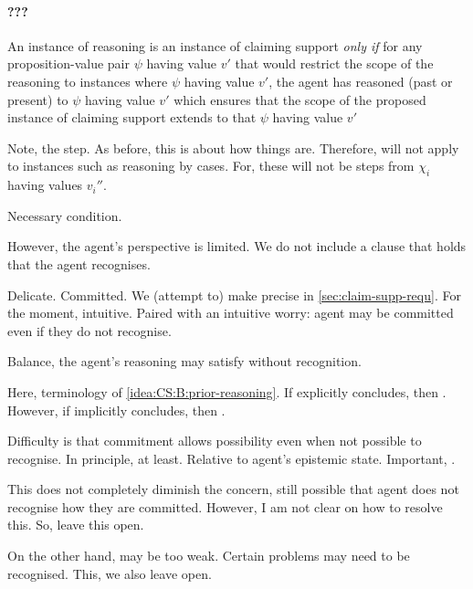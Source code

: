 \hozlinedash


\paragraph{???}

\begin{note}
  \color{red}
  An instance of reasoning is an instance of claiming support \emph{only if} for any proposition-value pair \(\psi\) having value \(v'\) that would restrict the scope of the reasoning to instances where \(\psi\) having value \(v'\), the agent has reasoned (past or present) to \(\psi\) having value \(v'\) which ensures that the scope of the proposed instance of claiming support extends to \ep{} that \(\psi\) having value \(v'\)
\end{note}

\begin{note}
  \color{red}
  Note, the step.
  As before, this is about how things are.
  Therefore, will not apply to instances such as reasoning by cases.
  For, these will not be steps from \(\chi_{i}\) having values \(v_{i}''\).

  Necessary condition.
\end{note}

\begin{note}
  However, the agent's perspective is limited.
  We do not include a clause that holds that the agent recognises.

  Delicate.
  Committed.
  We (attempt to) make precise in \autoref{sec:claim-supp-requ}.
  For the moment, intuitive.
  Paired with an intuitive worry: agent may be committed even if they do not recognise.

  Balance, the agent's reasoning may satisfy without recognition.

  Here,  terminology of \ref{idea:CS:B:prior-reasoning}.
  If explicitly concludes, then .
  However, if implicitly concludes, then .

  Difficulty is that commitment allows possibility even when not possible to recognise.
  In principle, at least.
  Relative to agent's epistemic state.
  Important, \ep{}.

  This does not completely diminish the concern, still possible that agent does not recognise how they are committed.
  However, I am not clear on how to resolve this.
  So, leave this open.

  On the other hand,  may be too weak.
  Certain problems may need to be recognised.
  This, we also leave open.
\end{note}


